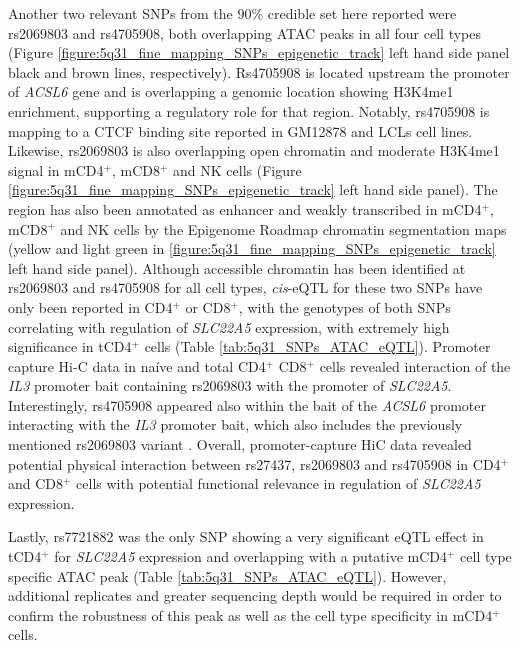 Another two relevant SNPs from the 90\% credible set here reported were rs2069803 and rs4705908, both overlapping ATAC peaks in all four cell types (Figure \ref{figure:5q31_fine_mapping_SNPs_epigenetic_track} left hand side panel black and brown lines, respectively). Rs4705908 is located upstream the promoter of \textit{ACSL6} gene and is overlapping a genomic location showing H3K4me1 enrichment, supporting a regulatory role for that region. Notably, rs4705908 is mapping to a CTCF binding site reported in GM12878 and LCLs cell lines. Likewise, rs2069803 is also overlapping open chromatin and moderate H3K4me1 signal in mCD4$^+$, mCD8$^+$ and NK cells (Figure \ref{figure:5q31_fine_mapping_SNPs_epigenetic_track} left hand side panel). The region has also been annotated as enhancer and weakly transcribed in mCD4$^+$, mCD8$^+$ and NK cells by the Epigenome Roadmap chromatin segmentation maps (yellow and light green in \ref{figure:5q31_fine_mapping_SNPs_epigenetic_track} left hand side panel). Although accessible chromatin has been identified at rs2069803 and rs4705908 for all cell types, \textit{cis}-eQTL for these two SNPs have only been reported in CD4$^+$ or CD8$^+$, with the genotypes of both SNPs correlating with regulation of \textit{SLC22A5} expression, with extremely high significance in tCD4$^+$ cells (Table \ref{tab:5q31_SNPs_ATAC_eQTL}). Promoter capture Hi-C data in na\'{i}ve and total CD4$^+$ CD8$^+$ cells revealed interaction of the \textit{IL3} promoter bait containing rs2069803  with the promoter of \textit{SLC22A5}. Interestingly, rs4705908 appeared also within the bait of the \textit{ACSL6} promoter interacting with the \textit{IL3} promoter bait, which also includes the previously mentioned rs2069803 variant . Overall, promoter-capture HiC data revealed potential physical interaction between rs27437, rs2069803 and rs4705908 in CD4$^+$ and CD8$^+$ cells with potential functional relevance in regulation of \textit{SLC22A5} expression.

Lastly, rs7721882 was the only SNP showing a very significant eQTL effect in tCD4$^+$ for \textit{SLC22A5} expression and overlapping with a putative mCD4$^+$ cell type specific ATAC peak (Table \ref{tab:5q31_SNPs_ATAC_eQTL}). However, additional replicates and greater sequencing depth would be required in order to confirm the robustness of this peak as well as the cell type specificity in mCD4$^+$ cells.  



